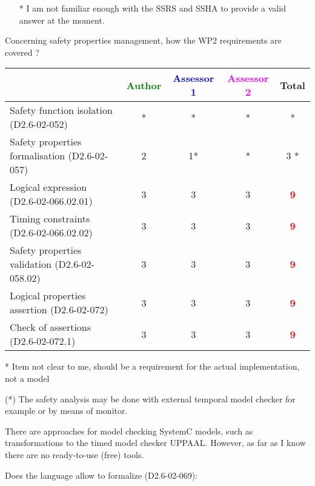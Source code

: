 \begin{assessor2}
  \begin{itemize}
  \item[*] I am not familiar enough with the SSRS and SSHA to provide a
    valid answer at the moment.
  \end{itemize}  
\end{assessor2}


Concerning safety properties management, how the WP2 requirements are covered ?

\begin{tabular}{|l | c | c | c | c|}
\hline
& \textcolor{green}{Author} & \textcolor{blue}{Assessor 1} & \textcolor{magenta}{Assessor 2} & Total \\
\hline
Safety function isolation (D2.6-02-052) &* & * & * & * \\
\hline
Safety properties formalisation (D2.6-02-057) &2 &1* & * & 3    * \\
\hline
Logical expression (D2.6-02-066.02.01) &3 &3 &3 & \textcolor{red}{\textbf{9}}  \\
\hline
Timing constraints (D2.6-02-066.02.02) &3 &3 &3 & \textcolor{red}{\textbf{9}} \\
\hline
Safety properties validation (D2.6-02-058.02) &3 &3 &3 & \textcolor{red}{\textbf{9}} \\
\hline
Logical properties assertion (D2.6-02-072) &3 &3 &3 & \textcolor{red}{\textbf{9}} \\
\hline
Check of assertions (D2.6-02-072.1) &3 &3 &3 & \textcolor{red}{\textbf{9}} \\
\hline
\end{tabular}


\begin{author_comment}
* Item not clear to me, should be a requirement for the actual implementation, not a model
\end{author_comment}

\begin{assessor1}
(*) The safety analysis may be done with external temporal model
checker for example or by means of monitor. 
\begin{author_comment}
There are approaches for model checking SystemC models, such as transformations to the timed model checker UPPAAL. However, as far as I know there are no ready-to-use (free) tools.
\end{author_comment}
\end{assessor1}
Does the language allow to formalize (D2.6-02-069):

